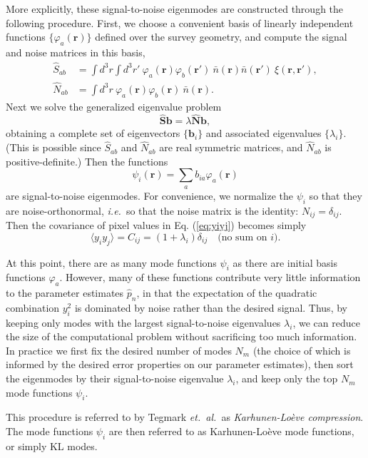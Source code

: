 \documentclass{article}
\newcommand{\ie}{\textit{i.e.}}
\newcommand{\etal}{\textit{et.~al.}}
\renewcommand{\vec}[1]{\bm{#1}}
\newcommand{\mat}[1]{\mathbf{#1}}
\renewcommand{\r}{\vec{r}}
\renewcommand{\phi}{\varphi}
\newcommand{\Shat}{\widehat{S}}
\newcommand{\Nhat}{\widehat{N}}
\begin{document}
More explicitly, these signal-to-noise eigenmodes are constructed through the
following procedure.  First, we choose a convenient basis of linearly
independent functions $\{\phi_a(\r)\}$ defined over the survey geometry, and
compute the signal and noise matrices in this basis,
\begin{align}
    \Shat_{ab} &= \int d^3r \int d^3r'~ \phi_a(\r) \phi_b(\r')~ \bar{n}(\r) \bar{n}(\r')~ \xi(\r,\r'), \\
    \Nhat_{ab} &= \int d^3r~ \phi_a(\r) \phi_b(\r)~ \bar{n}(\r).
\end{align}
Next we solve the generalized eigenvalue problem
\begin{equation}
    \mat{\Shat} \mat{b} = \lambda \mat{\Nhat} \mat{b},
\end{equation}
obtaining a complete set of eigenvectors $\{\mat{b}_i\}$ and associated
eigenvalues $\{\lambda_i\}$.  (This is possible since $\Shat_{ab}$ and
$\Nhat_{ab}$ are real symmetric matrices, and $\Nhat_{ab}$ is
positive-definite.)  Then the functions
\begin{equation}
    \psi_i(\r) = \sum_a b_{ia} \phi_a(\r)
\end{equation}
are signal-to-noise eigenmodes.  For convenience, we normalize the $\psi_i$ so
that they are noise-orthonormal, \ie~so that the noise matrix is the identity:
$N_{ij} = \delta_{ij}$.  Then the covariance of pixel values in Eq.
(\ref{eq:yiyj}) becomes simply
\begin{equation}
    \langle y_i y_j \rangle = C_{ij} = (1 + \lambda_i) \delta_{ij} \quad \text{(no sum on $i$)}.
\end{equation}

At this point, there are as many mode functions $\psi_i$ as there are initial
basis functions $\phi_a$.  However, many of these functions contribute very
little information to the parameter estimates $\hat{p}_n$, in that the
expectation of the quadratic combination $y_i^2$ is dominated by noise rather
than the desired signal.  Thus, by keeping only modes with the largest
signal-to-noise eigenvalues $\lambda_i$, we can reduce the size of the
computational problem without sacrificing too much information.  In practice we
first fix the desired number of modes $N_m$ (the choice of which is informed by
the desired error properties on our parameter estimates), then sort the
eigenmodes by their signal-to-noise eigenvalue $\lambda_i$, and keep only the
top $N_m$ mode functions $\psi_i$.

This procedure is referred to by Tegmark \etal~as \emph{Karhunen-Lo\`{e}ve
compression}.  The mode functions $\psi_i$ are then referred to as
Karhunen-Lo\`{e}ve mode functions, or simply KL modes.
\end{document}
